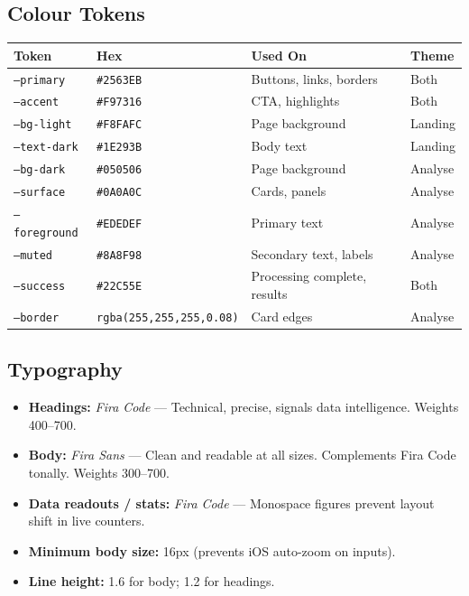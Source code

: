 \documentclass[12pt,a4paper]{article}
\begin{document}
\subsection{Colour Tokens}

\begin{center}
\begin{tabular}{llll}
\toprule
\textbf{Token} & \textbf{Hex} & \textbf{Used On} & \textbf{Theme} \\
\midrule
\texttt{--primary}    & \texttt{\#2563EB} & Buttons, links, borders      & Both \\
\texttt{--accent}     & \texttt{\#F97316} & CTA, highlights              & Both \\
\texttt{--bg-light}   & \texttt{\#F8FAFC} & Page background              & Landing \\
\texttt{--text-dark}  & \texttt{\#1E293B} & Body text                    & Landing \\
\texttt{--bg-dark}    & \texttt{\#050506} & Page background              & Analyse \\
\texttt{--surface}    & \texttt{\#0A0A0C} & Cards, panels                & Analyse \\
\texttt{--foreground} & \texttt{\#EDEDEF} & Primary text                 & Analyse \\
\texttt{--muted}      & \texttt{\#8A8F98} & Secondary text, labels       & Analyse \\
\texttt{--success}    & \texttt{\#22C55E} & Processing complete, results & Both \\
\texttt{--border}     & \texttt{rgba(255,255,255,0.08)} & Card edges  & Analyse \\
\bottomrule
\end{tabular}
\end{center}

\subsection{Typography}

\begin{tcolorbox}[recbox, title={Font Pairing}]
  \begin{itemize}[leftmargin=1.2em]
    \item \textbf{Headings:} \textit{Fira Code} — Technical, precise, signals
          data intelligence. Weights 400--700.
    \item \textbf{Body:} \textit{Fira Sans} — Clean and readable at all sizes.
          Complements Fira Code tonally. Weights 300--700.
    \item \textbf{Data readouts / stats:} \textit{Fira Code} — Monospace figures
          prevent layout shift in live counters.
    \item \textbf{Minimum body size:} 16px (prevents iOS auto-zoom on inputs).
    \item \textbf{Line height:} 1.6 for body; 1.2 for headings.
  \end{itemize}
\end{tcolorbox}
\end{document}
